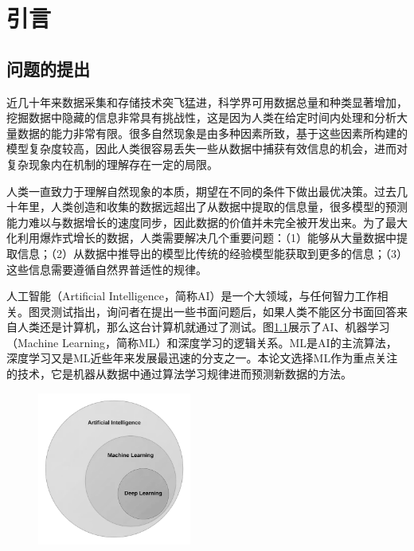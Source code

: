 \chapter{引言}\label{chap:introduction}

\section{问题的提出}\label{sec:intro_question}

近几十年来数据采集和存储技术突飞猛进，科学界可用数据总量和种类显著增加，挖掘数据中隐藏的信息非常具有挑战性，这是因为人类在给定时间内处理和分析大量数据的能力非常有限\citep{bougher2016machine}。很多自然现象是由多种因素所致，基于这些因素所构建的模型复杂度较高\citep{reitsma2010geoscience}，因此人类很容易丢失一些从数据中捕获有效信息的机会，进而对复杂现象内在机制的理解存在一定的局限\citep{feyyad1996data}。

人类一直致力于理解自然现象的本质，期望在不同的条件下做出最优决策。过去几十年里，人类创造和收集的数据远超出了从数据中提取的信息量，很多模型的预测能力难以与数据增长的速度同步，因此数据的价值并未完全被开发出来。为了最大化利用爆炸式增长的数据，人类需要解决几个重要问题：（1）能够从大量数据中提取信息；（2）从数据中推导出的模型比传统的经验模型能获取到更多的信息；（3）这些信息需要遵循自然界普适性的规律。

人工智能（Artificial Intelligence，简称AI）是一个大领域，与任何智力工作相关。图灵测试指出，询问者在提出一些书面问题后，如果人类不能区分书面回答来自人类还是计算机，那么这台计算机就通过了测试\citep{turing2009computing}。图\ref{fig:intro_AI_ML}展示了AI、机器学习（Machine Learning，简称ML）和深度学习的逻辑关系。ML是AI的主流算法，深度学习又是ML近些年来发展最迅速的分支之一。本论文选择ML作为重点关注的技术，它是机器从数据中通过算法学习规律进而预测新数据的方法。

\begin{figure}[!htbp]
  \centering
  \noindent\includegraphics[width=0.45\textwidth]{Img/chap1_intro/AI_ML.png}
  \vspace{-0.6cm}
  \label{fig:intro_AI_ML}
\end{figure}

